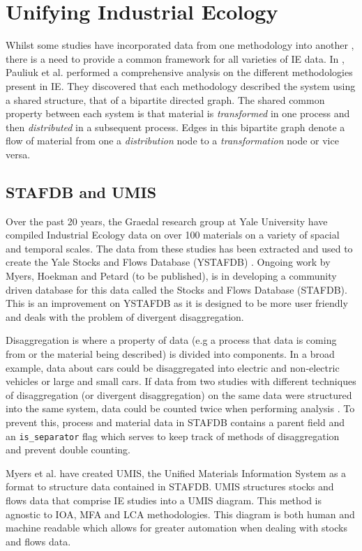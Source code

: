 \documentclass[ %
                    author={Tom Jager},
                supervisor={Dr. Daniel Schien},
                    degree={MEng},
                     title={A Bayesian Inference Engine for Calibrating Uncertainty over UMIS Structured MFA Systems},
                  subtitle={},
                      type={research},
                      year={2019} ]{dissertation}
\begin{document}
\section{Unifying Industrial Ecology}
Whilst some studies have incorporated data from one methodology into another \cite{chen2016building}, there is a need to provide a common framework for all varieties of IE data. In \cite{pauliuk2015general}, Pauliuk et al. performed a comprehensive analysis on the different methodologies present in IE. They discovered that each methodology described the system using a shared structure, that of a bipartite directed graph. The shared common property between each system is that material is \textit{transformed} in one process and then \textit{distributed} in a subsequent process. Edges in this bipartite graph denote a flow of material from one a \textit{distribution} node to a \textit{transformation} node or vice versa.

\subsection{STAFDB and UMIS}
Over the past 20 years, the Graedal research group at Yale University have compiled Industrial Ecology data on over 100 materials on a variety of spacial and temporal scales. The data from these studies has been extracted and used to create the Yale Stocks and Flows Database (YSTAFDB) \cite{ystafdb}. Ongoing work by Myers, Hoekman and Petard (to be published), is in developing a community driven database for this data called the Stocks and Flows Database (STAFDB). This is an improvement on YSTAFDB as it is designed to be more user friendly and deals with the problem of divergent disaggregation.

Disaggregation is where a property of data (e.g a process that data is coming from or the material being described) is divided into components. In a broad example, data about cars could be disaggregated into electric and non-electric vehicles or large and small cars. If data from two studies with different techniques of disaggregation (or divergent disaggregation) on the same data were structured into the same system, data could be counted twice when performing analysis \cite{myers2019unified}. To prevent this, process and material data in STAFDB contains a parent field and an \texttt{is\_separator} flag which serves to keep track of methods of disaggregation and prevent double counting.

Myers et al. have created UMIS, the Unified Materials Information System \cite{myers2019unified} as a format to structure data contained in STAFDB. UMIS structures stocks and flows data that comprise IE studies into a UMIS diagram. This method is agnostic to IOA, MFA and LCA methodologies. This diagram is both human and machine readable which allows for greater automation when dealing with stocks and flows data.
\end{document}
